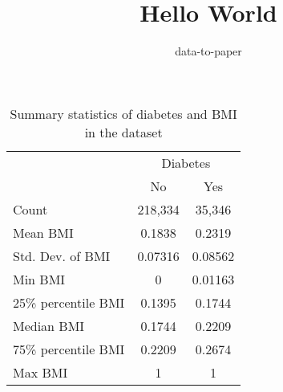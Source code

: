 \documentclass[12pt]{article}
\title{Hello World}
\author{data-to-paper}
\begin{document}
\maketitle

\begin{table}[ht]
\centering
\caption{Summary statistics of diabetes and BMI in the dataset}
\label{table:summary_statistics}
\begin{tabular}{lcc}
\toprule
 & \multicolumn{2}{c}{Diabetes} \\
\cmidrule(lr){2-3}
 & No & Yes \\
\midrule
Count & 218,334 & 35,346 \\
Mean BMI & 0.1838 & 0.2319 \\
Std. Dev. of BMI & 0.07316 & 0.08562 \\
Min BMI & 0 & 0.01163\\
25\% percentile BMI & 0.1395 & 0.1744\\
Median BMI & 0.1744 & 0.2209\\
75\% percentile BMI & 0.2209 & 0.2674\\
Max BMI & 1 &  1 \\
\bottomrule
\end{tabular}
\end{table}
\end{document}
